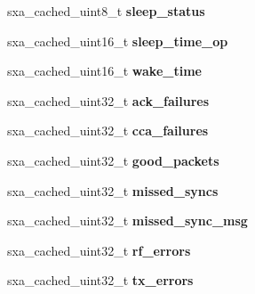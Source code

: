 \begin{DoxyCompactItemize}
\item 
\hypertarget{structsxa__node__t_a0966b19e355117ac1fd4b0803385f4a0}{sxa\-\_\-cached\-\_\-uint8\-\_\-t {\bfseries sleep\-\_\-status}}\label{structsxa__node__t_a0966b19e355117ac1fd4b0803385f4a0}

\item 
\hypertarget{structsxa__node__t_a731ed9c34ea8cd4c59e540336a2f754b}{sxa\-\_\-cached\-\_\-uint16\-\_\-t {\bfseries sleep\-\_\-time\-\_\-op}}\label{structsxa__node__t_a731ed9c34ea8cd4c59e540336a2f754b}

\item 
\hypertarget{structsxa__node__t_a60c7dd44749ecf219809ebea0923156c}{sxa\-\_\-cached\-\_\-uint16\-\_\-t {\bfseries wake\-\_\-time}}\label{structsxa__node__t_a60c7dd44749ecf219809ebea0923156c}

\item 
\hypertarget{structsxa__node__t_a1d997ce4ddc636bf758ce8b467c6375c}{sxa\-\_\-cached\-\_\-uint32\-\_\-t {\bfseries ack\-\_\-failures}}\label{structsxa__node__t_a1d997ce4ddc636bf758ce8b467c6375c}

\item 
\hypertarget{structsxa__node__t_ae386d0a73ecaa5d9e8ecdf2a5c1c937a}{sxa\-\_\-cached\-\_\-uint32\-\_\-t {\bfseries cca\-\_\-failures}}\label{structsxa__node__t_ae386d0a73ecaa5d9e8ecdf2a5c1c937a}

\item 
\hypertarget{structsxa__node__t_ab651a5fe7d96c4a7310cf30dc5693f7d}{sxa\-\_\-cached\-\_\-uint32\-\_\-t {\bfseries good\-\_\-packets}}\label{structsxa__node__t_ab651a5fe7d96c4a7310cf30dc5693f7d}

\item 
\hypertarget{structsxa__node__t_ac7aa17ed22ae2c91a61313365fd9d37d}{sxa\-\_\-cached\-\_\-uint32\-\_\-t {\bfseries missed\-\_\-syncs}}\label{structsxa__node__t_ac7aa17ed22ae2c91a61313365fd9d37d}

\item 
\hypertarget{structsxa__node__t_ae5c478ae4e83cf0d44c55ab530a7c265}{sxa\-\_\-cached\-\_\-uint32\-\_\-t {\bfseries missed\-\_\-sync\-\_\-msg}}\label{structsxa__node__t_ae5c478ae4e83cf0d44c55ab530a7c265}

\item 
\hypertarget{structsxa__node__t_a2aceee1ec0b4d950e907d33ee61bf31f}{sxa\-\_\-cached\-\_\-uint32\-\_\-t {\bfseries rf\-\_\-errors}}\label{structsxa__node__t_a2aceee1ec0b4d950e907d33ee61bf31f}

\item 
\hypertarget{structsxa__node__t_a98a3b8427635213b5171534ae43c0df9}{sxa\-\_\-cached\-\_\-uint32\-\_\-t {\bfseries tx\-\_\-errors}}\label{structsxa__node__t_a98a3b8427635213b5171534ae43c0df9}

\end{DoxyCompactItemize}



